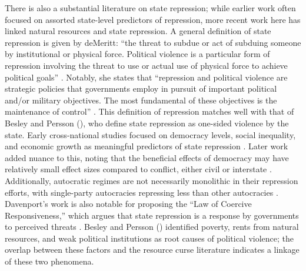 There is also a substantial literature on state repression; while earlier work often focused on assorted state-level predictors of repression, more recent work here has linked natural resources and state repression. A general definition of state repression is given by deMeritt: “the threat to subdue or act of subduing someone by institutional or physical force. Political violence is a particular form of repression involving the threat to use or actual use of physical force to achieve political goals” \cite[p.~2]{deMeritt16}. Notably, she states that “repression and political violence are strategic policies that governments employ in pursuit of important political and/or military objectives. The most fundamental of these objectives is the maintenance of control” \cite[p.~2]{deMeritt16}. This definition of repression matches well with that of Besley and Persson (\citeyear{BP09}), who define state repression as one-sided violence by the state. Early cross-national studies focused on democracy levels, social inequality, and economic growth as meaningful predictors of state repression \cite{Henderson91,Davenport95}. Later work added nuance to this, noting that the beneficial effects of democracy may have relatively small effect sizes compared to conflict, either civil or interstate \cite{Davenport04}. Additionally, autocratic regimes are not necessarily monolithic in their repression efforts, with single-party autocracies repressing less than other autocracies \cite{Davenport07}. Davenport’s work is also notable for proposing the “Law of Coercive Responsiveness,” which argues that state repression is a response by governments to perceived threats \cite{Davenport07b}. Besley and Persson (\citeyear{BP09}) identified poverty, rents from natural resources, and weak political institutions as root causes of political violence; the overlap between these factors and the resource curse literature indicates a linkage of these two phenomena.

